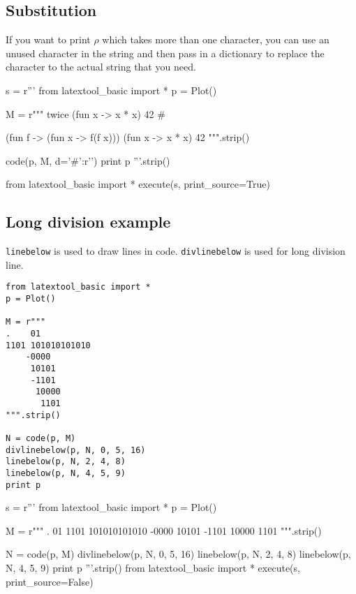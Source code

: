 \newpage
\subsection{Substitution}

If you want to print $\rho$ which takes more than
one character, you can use an unused character in the string and then
pass in a dictionary to replace the character to the actual
string that you need.

\begin{python}
s = r'''
from latextool_basic import *
p = Plot()

M = r"""
twice (fun x -> x * x) 42    #


(fun f -> (fun x -> f(f x))) (fun x -> x * x) 42
""".strip()

code(p, M, d={'#':r'\textred{$\rho$}'})
print p
'''.strip()

from latextool_basic import *
execute(s, print_source=True)
\end{python}

\newpage
\subsection{Long division example}

\verb!linebelow! is used to draw lines in code.
\verb!divlinebelow! is used for long division line.

\begin{Verbatim}[frame=single]
from latextool_basic import *
p = Plot()
    
M = r"""
.    01
1101 101010101010
    -0000
     10101
     -1101
      10000
       1101
""".strip()

N = code(p, M)
divlinebelow(p, N, 0, 5, 16)
linebelow(p, N, 2, 4, 8)
linebelow(p, N, 4, 5, 9)
print p
\end{Verbatim}

\begin{python}
s = r'''
from latextool_basic import *
p = Plot()

    
M = r"""
.    01
1101 101010101010
    -0000
     10101
     -1101
      10000
       1101
""".strip()

N = code(p, M)
divlinebelow(p, N, 0, 5, 16)
linebelow(p, N, 2, 4, 8)
linebelow(p, N, 4, 5, 9)
print p
'''.strip()
from latextool_basic import *
execute(s, print_source=False)
\end{python}
